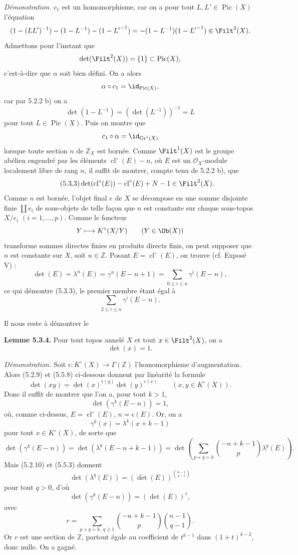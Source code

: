 \documentclass[11pt]{article}
\newcommand{\Gr}{\operatorname{Gr}}
\newcommand{\cl}{\operatorname{cl}}
\providecommand{\Pic}{\operatorname{Pic}}
\providecommand{\Gr}{\operatorname{Gr}}
\providecommand{\Gr}{\operatorname{G}}
\begin{document}
\emph{Démonstration.} \(c_1\) est un homomorphisme, car on a pour tout \(L,L'\in\Pic(X)\) l'équation
\[
 (1-(LL')^{-1})-(1-L^{-1})-(1-{L'}^{-1})
 =
 -(1-L^{-1})(1-{L'}^{-1})\in\Filt^2(X).
\]
Admettons pour l'instant que
\[
 \det(\Filt^2(X))=\{1\}\subset\Pic(X),
\]
c'est-à-dire que \(\alpha\) soit bien défini. On a alors
\[
 \alpha\circ c_1=\id_{\Pic(X)},
\]
car par 5.2.2 b) on a
\[
 \det(1-L^{-1})=(\det(L^{-1}))^{-1}=L
\]
pour tout \(L\in\Pic(X)\). Puis on montre que
\[
 c_1\circ\alpha=\id_{\Gr^1(X)}
\]
lorsque toute section \(n\) de \(\mathbb Z_X\) est bornée. Comme \(\Filt^1(X)\) est le groupe abélien engendré par les éléments \(\cl^\circ(E)-n\), où \(E\) est un \(\mathcal O_X\)-module localement libre de rang \(n\), il suffit de montrer, compte tenu de 5.2.2 b), que
\begin{equation}\tag{5.3.3}
 \det(\cl^\circ(E))-\cl^\circ(E)+N-1\in\Filt^2(X).
\end{equation}
Comme \(n\) est bornée, l'objet final \(e\) de \(X\) se décompose en une somme disjointe finie \(\coprod e_i\) de sous-objets de telle façon que \(n\) est constante sur chaque sous-topos \(X/e_i\) \((i=1,\ldots,p)\). Comme le foncteur
\[
Y\longmapsto K^\circ(X/Y)\qquad(Y\in\Ob(X))
\]
transforme sommes directes finies en produits directs finis, on peut supposer que \(n\) est constante sur \(X\), soit \(n\in\mathbb Z\). Posant \(E=\cl^\circ(E)\), on trouve (cf. Exposé V) :
\[
 \det(E)=\lambda^n(E)=\gamma^n(E-n+1)
 =
 \sum_{0\leq i\leq n}\gamma^i(E-n),
\]
ce qui démontre (5.3.3), le premier membre étant égal à
\[
 \sum_{2\leq i\leq n}\gamma^i(E-n).
\]

Il nous reste à démontrer le

\textbf{Lemme 5.3.4.} Pour tout topos annelé \(X\) et tout \(x\in\Filt^2(X)\), on a
\[
 \det(x)=1.
\]

\emph{Démonstration.} Soit \(\epsilon:K^\circ(X)\to\Gamma(\mathbb Z)\) l'homomorphisme d'augmentation. Alors (5.2.9) et (5.5.8) ci-dessous donnent par linéarité la formule
\begin{equation}\tag{5.3.5}
 \det(xy)=\det(x)^{\epsilon(y)}\det(y)^{\epsilon(x)}
 \qquad(x,y\in K^\circ(X)).
\end{equation}
Donc il suffit de montrer que l'on a, pour tout \(k>1\),
\[
 \det(\gamma^k(E-n))=1,
\]
où, comme ci-dessus, \(E=\cl^\circ(E)\), \(n=\epsilon(E)\). Or, on a
\[
 \gamma^k(x)=\lambda^k(x+k-1)
\]
pour tout \(x\in K^\circ(X)\), de sorte que
\[
 \det(\gamma^k(E-n))
 =
 \det(\lambda^k(E-n+k-1))
 =
 \det\left(\sum_{p+q=k}\binom{-n+k-1}{p}\lambda^q(E)\right).
\]
Mais (5.2.10) et (5.5.3) donnent
\[
 \det(\lambda^q(E))=(\det(E))^{\binom{n-1}{q-1}}
\]
pour tout \(q>0\), d'où
\[
 \det(\gamma^k(E-n))=(\det(E))^r,
\]
avec
\[
 r=\sum_{p+q=k,\ q\geq1}
 \binom{-n+k-1}{p}\binom{n-1}{q-1}.
\]
Or \(r\) est une section de \(\mathbb Z\), partout égale au coefficient de \(t^{k-1}\) dans \((1+t)^{k-2}\), donc nulle. On a gagné.
\end{document}

